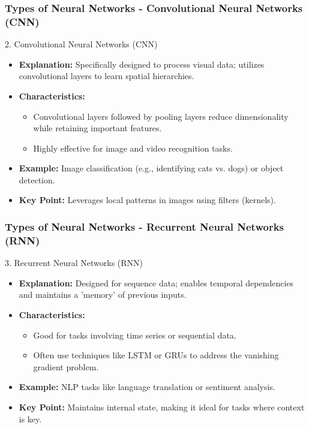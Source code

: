 \documentclass[aspectratio=169]{beamer}
\begin{document}
\begin{frame}[fragile]
    \frametitle{Types of Neural Networks - Convolutional Neural Networks (CNN)}
    \begin{block}{2. Convolutional Neural Networks (CNN)}
        \begin{itemize}
            \item \textbf{Explanation:} Specifically designed to process visual data; utilizes convolutional layers to learn spatial hierarchies.
            \item \textbf{Characteristics:}
                \begin{itemize}
                    \item Convolutional layers followed by pooling layers reduce dimensionality while retaining important features.
                    \item Highly effective for image and video recognition tasks.
                \end{itemize}
            \item \textbf{Example:} Image classification (e.g., identifying cats vs. dogs) or object detection.
            \item \textbf{Key Point:} Leverages local patterns in images using filters (kernels).
        \end{itemize}
    \end{block}
\end{frame}

\begin{frame}[fragile]
    \frametitle{Types of Neural Networks - Recurrent Neural Networks (RNN)}
    \begin{block}{3. Recurrent Neural Networks (RNN)}
        \begin{itemize}
            \item \textbf{Explanation:} Designed for sequence data; enables temporal dependencies and maintains a 'memory' of previous inputs.
            \item \textbf{Characteristics:}
                \begin{itemize}
                    \item Good for tasks involving time series or sequential data.
                    \item Often use techniques like LSTM or GRUs to address the vanishing gradient problem.
                \end{itemize}
            \item \textbf{Example:} NLP tasks like language translation or sentiment analysis.
            \item \textbf{Key Point:} Maintains internal state, making it ideal for tasks where context is key.
        \end{itemize}
    \end{block}
\end{frame}
\end{document}
